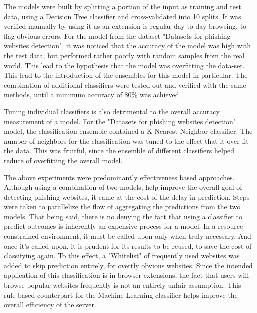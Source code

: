 \documentclass[conference]{IEEEtran}
\begin{document}
\par The models were built by splitting a portion of the input as training and test data, using a Decision Tree classifier and cross-validated into 10 splits. It was verified manually by using it as an extension is regular day-to-day browsing, to flag obvious errors. For the model from the dataset "Datasets  for  phishing  websites  detection", it was noticed that the accuracy of the model was high with the test data, but performed rather poorly with random samples from the real world. This lead to the hypothesis that the model was overfitting the data-set. This lead to the introduction of the ensembles for this model in particular. The combination of additional classifiers were tested out and verified with the same methods, until a minimum accuracy of 80\% was achieved.

\par Tuning individual classifiers is also detrimental to the overall accuracy measurement of a model. For the "Datasets  for  phishing  websites  detection" model, the classification-ensemble contained a K-Nearest Neighbor classifier. The number of neighbors for the classification was tuned to the effect that it over-fit the data. This was fruitful, since the ensemble of different classifiers helped reduce of overfitting the overall model.

\par The above experiments were predominantly effectiveness based approaches. Although using a combination of two models, help improve the overall goal of detecting phishing websites, it came at the cost of the delay in prediction. Steps were taken to parallelize the flow of aggregating the predictions from the two models. That being said, there is no denying the fact that using a classifier to predict outcomes is inherently an expensive process for a model. In a resource constrained environment, it must be called upon only when truly necessary. And once it's called upon, it is prudent for its results to be reused, to save the cost of classifying again. To this effect, a "Whitelist" of frequently used websites was added to skip prediction entirely, for overtly obvious websites. Since the intended application of this classification is in browser extensions,  the fact that users will browse popular websites frequently is not an entirely unfair assumption. This rule-based counterpart for the Machine Learning classifier helps improve the overall efficiency of the server.
\end{document}

